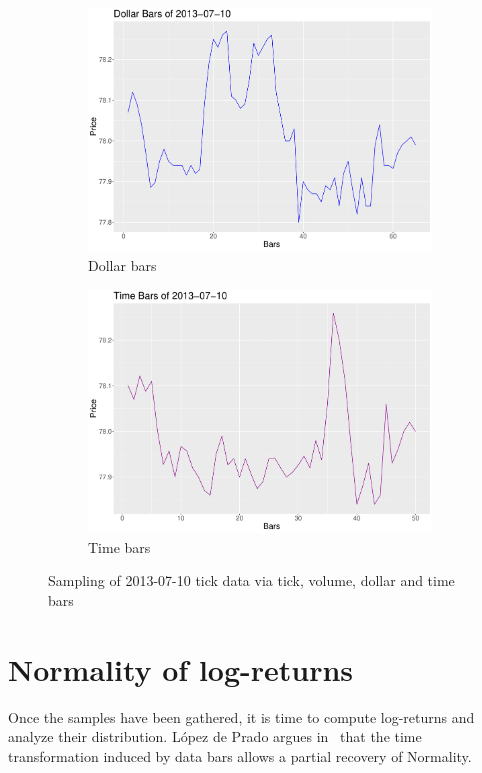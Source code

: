 \begin{figure}[htbp]
	\begin{subfigure}{.5\textwidth}
		\centering
		\includegraphics[scale=.25]{img/dataBars/dollarZoom}
		\caption{Dollar bars}
	\end{subfigure}%
	\begin{subfigure}{.5\textwidth}
		\centering
		\includegraphics[scale=.25]{img/dataBars/timeZoom}
		\caption{Time bars}
	\end{subfigure}%
	
	\caption{Sampling of 2013-07-10 tick data via tick, volume, dollar and 
	time bars}
	\label{fig:intradayDeformed}
\end{figure}

\newpage

\section{Normality of log-returns}
\label{sec:normalLogRet}
Once the samples have been gathered, it is time to compute log-returns and 
analyze their distribution. López de Prado argues in~\cite{volumeClock} that 
the time transformation induced by data bars allows a partial recovery of 
Normality.\\

